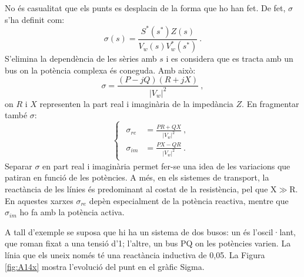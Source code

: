 No és casualitat que els punts es desplacin de la forma que ho han fet. De fet, $\sigma$ s'ha definit com:
\begin{equation}
    \sigma(s)=\frac{S^*(s^*)Z(s)}{V_w(s)V^*_w(s^*)}\ .
    \label{sig.A16x}
\end{equation}
S'elimina la dependència de les sèries amb $s$ i es considera que es tracta amb un bus on la potència complexa és coneguda. Amb això:
\begin{equation}
    \sigma=\frac{(P-jQ)(R+jX)}{|V_w|^2}\ ,
    \label{sig.A17}
\end{equation}
on $R$ i $X$ representen la part real i imaginària de la impedància $Z$. En fragmentar també $\sigma$:
\begin{equation}
    \begin{cases}
    \begin{split}
        \sigma_{re}&=\frac{PR+QX}{|V_w|^2}\ ,\\
        \sigma_{im}&=\frac{PX-QR}{|V_w|^2}\ .
    \end{split}
\end{cases}
    \label{sig.A18}
\end{equation}
Separar $\sigma$ en part real i imaginària permet fer-se una idea de les variacions que patiran en funció de les potències. A més, en els sistemes de transport, la reactància de les línies és predominant al costat de la resistència, pel que X$\gg$R. En aquestes xarxes $\sigma_{re}$ depèn especialment de la potència reactiva, mentre que $\sigma_{im}$ ho fa amb la potència activa. 

A tall d'exemple se suposa que hi ha un sistema de dos busos: un és l'oscil·lant, que roman fixat a una tensió d'1; l'altre, un bus PQ on les potències varien. La línia que els uneix només té una reactància inductiva de 0,05. La Figura \ref{fig:A14x} mostra l'evolució del punt en el gràfic Sigma.

